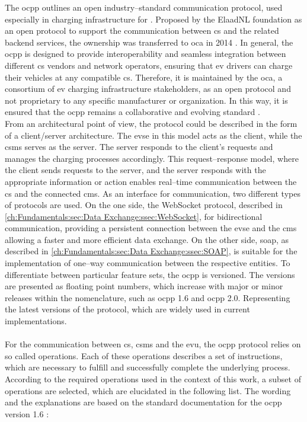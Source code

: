 The \acrfull{ocpp} outlines an open industry--standard communication protocol, used especially in charging infrastructure for . Proposed by the ElaadNL foundation as an open protocol to support the communication between \acrshort{cs} and the related backend services, the ownership was transferred to \acrshort{oca} in 2014 \cite{garofalaki_electric_2022}.
In general, the \acrshort{ocpp} is designed to provide interoperability and seamless integration between different \acrshort{cs} vendors and network operators, ensuring that \acrshort{ev} drivers can charge their vehicles at any compatible \acrshort{cs}.
Therefore, it is maintained by the \acrfull{oca}, a consortium of \acrshort{ev} charging infrastructure stakeholders, as an open protocol and not proprietary to any specific manufacturer or organization.
In this way, it is ensured that the \acrshort{ocpp} remains a collaborative and evolving standard \cite{noauthor_ocpp_nodate}. \\
From an architectural point of view, the protocol could be described in the form of a client/server architecture. The \acrshort{evse} in this model acts as the client, while the \acrshort{csms} serves as the server.
The server responds to the client's requests and manages the charging processes accordingly. This request--response model, where the client sends requests to the server, and the server responds with the appropriate information or action enables real--time communication between the \acrfull{cs} and the connected \acrfull{cms}.
As an interface for communication, two different types of protocols are used. On the one side, the WebSocket protocol, described in \ref{ch:Fundamentals:sec:Data Exchange:ssec:WebSocket}, for bidirectional communication, providing a persistent connection between the \acrshort{evse} and the \acrshort{cms} allowing a faster and more efficient data exchange. On the other side, \acrfull{soap}, as described in \ref{ch:Fundamentals:sec:Data Exchange:ssec:SOAP}, is suitable for the implementation of one--way communication between the respective entities.
To differentiate between particular feature sets, the \acrshort{ocpp} is versioned.
The versions are presented as floating point numbers, which increase with major or minor releases within the nomenclature, such as \acrshort{ocpp} 1.6 and \acrshort{ocpp} 2.0. Representing the latest versions of the protocol, which are widely used in current implementations. \\ \\
\noindent For the communication between \acrshort{cs}, \acrshort{csms} and the \acrshort{evu}, the \acrshort{ocpp} protocol relies on so called operations. Each of these operations describes a set of instructions, which are necessary to fulfill and successfully complete the underlying process.
According to the required operations used in the context of this work, a subset of operations are selected, which are elucidated in the following list.
The wording and the explanations are based on the standard documentation for the \acrshort{ocpp} version 1.6 \cite{noauthor_ocpp_nodate}:

